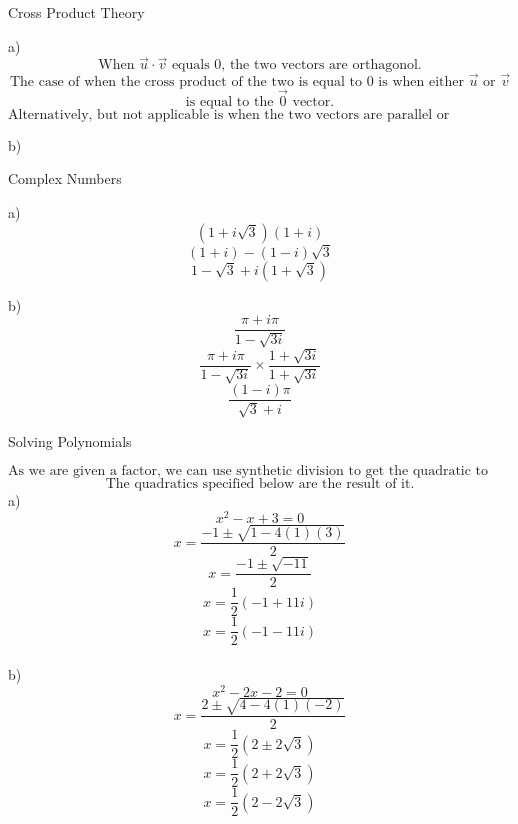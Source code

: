 \documentclass[12pt]{article}
\newenvironment{problem}[2][Problem]{\begin{trivlist}
\item[\hskip \labelsep {\bfseries #1}\hskip \labelsep {\bfseries #2.}]}{\end{trivlist}}
\begin{document}
	
	
\begin{problem}{8}
	Cross Product Theory
\end{problem}
a)\\
	\[\text{When } \vec u \cdot \vec v \text{ equals 0, the two vectors are orthagonol.}\]
	\[\text{The case of when the cross product of the two is equal to 0 is when either } \vec u \text{ or } \vec v\]
	\[\text{is equal to the } \vec 0 \text{ vector.} \]
	\[\text{Alternatively, but not applicable is when the two vectors are parallel or antiparallel.}\]

b)\\
	

\begin{problem}{9}
	Complex Numbers
\end{problem}
a)\\
	\[(1+ i\sqrt{3})(1 + i)\]
	\[(1+i)-(1-i)\sqrt{3}\]
	\[1 - \sqrt{3} + i(1 + \sqrt{3})\]

b)\\
	\[\frac{\pi + i\pi}{1 - \sqrt{3i}}\]
	\[\frac{\pi + i\pi}{1 - \sqrt{3i}} \times \frac{1 + \sqrt{3i}}{1 + \sqrt{3i}} \]
	\[\frac{(1 -i) \pi}{\sqrt{3} + i}\]


\begin{problem}{10}
	Solving Polynomials
\end{problem}

	\[\text{As we are given a factor, we can use synthetic division to get the quadratic to solve.}\]
	\[\text{The quadratics specified below are the result of it.}\]
a)\\
	\[x^2 -x + 3 = 0\]
	\[x = \frac{-1 \pm \sqrt{1 - 4(1)(3)}}{2}\]
	\[x = \frac{-1 \pm \sqrt{-11}}{2}\]
	\[x = \frac{1}{2} (-1 + 11i)\]
	\[x = \frac{1}{2} (-1 - 11i)\]\\
b)\\
	\[x^2 -2x -2 = 0\]
	\[x = \frac{2 \pm \sqrt{4 - 4(1)(-2)}}{2}\]
	\[x = \frac{1}{2} (2 \pm 2\sqrt{3})\]
	\[x = \frac{1}{2} (2 + 2\sqrt{3})\]
	\[x = \frac{1}{2} (2 - 2\sqrt{3})\]
	
\end{document}
